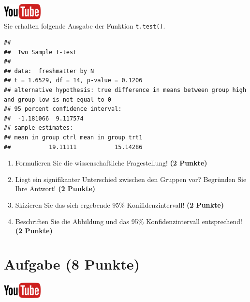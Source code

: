 \documentclass[a4paper, 10pt]{scrartcl}\usepackage[]{graphicx}\usepackage[]{xcolor}
\makeatletter
\newenvironment{kframe}{%
 \def\at@end@of@kframe{}%
 \ifinner\ifhmode%
  \def\at@end@of@kframe{\end{minipage}}%
  \begin{minipage}{\columnwidth}%
 \fi\fi%
 \def\FrameCommand##1{\hskip\@totalleftmargin \hskip-\fboxsep
 \colorbox{shadecolor}{##1}\hskip-\fboxsep
     \hskip-\linewidth \hskip-\@totalleftmargin \hskip\columnwidth}%
 \MakeFramed {\advance\hsize-\width
   \@totalleftmargin\z@ \linewidth\hsize
   \@setminipage}}%
 {\par\unskip\endMakeFramed%
 \at@end@of@kframe}
\newenvironment{knitrout}{}{} %
\makeatother
\begin{document}
\hfill\href{https://youtu.be/wJqsNV1hOW8}{\includegraphics[width =
  2cm]{img/youtube}}\\[1Ex]

Sie erhalten folgende \Rlogo Ausgabe der Funktion \texttt{t.test()}.

\begin{knitrout}
\color{fgcolor}\begin{kframe}
\begin{verbatim}
## 
## 	Two Sample t-test
## 
## data:  freshmatter by N
## t = 1.6529, df = 14, p-value = 0.1206
## alternative hypothesis: true difference in means between group high and group low is not equal to 0
## 95 percent confidence interval:
##  -1.181066  9.117574
## sample estimates:
## mean in group ctrl mean in group trt1 
##           19.11111           15.14286
\end{verbatim}
\end{kframe}
\end{knitrout}


\begin{enumerate}
  \item Formulieren Sie die wissenschaftliche Fragestellung! \textbf{(2
Punkte)}
\item Liegt ein signifikanter Unterschied zwischen den Gruppen vor?
  Begr{\"u}nden Sie Ihre Antwort! \textbf{(2 Punkte)}
\item Skizieren Sie das sich ergebende 95\% Konifidenzintervall! \textbf{(2 Punkte)}
\item Beschriften Sie die Abbildung und
  das 95\% Konfidenzintervall entsprechend! \textbf{(2 Punkte)}  
\end{enumerate} 
\clearpage

\section{Aufgabe \hfill (8 Punkte)}

\hfill\href{https://youtu.be/w62HJlbN28U}{\includegraphics[width =
  2cm]{img/youtube}}\\[1Ex]
\end{document}
